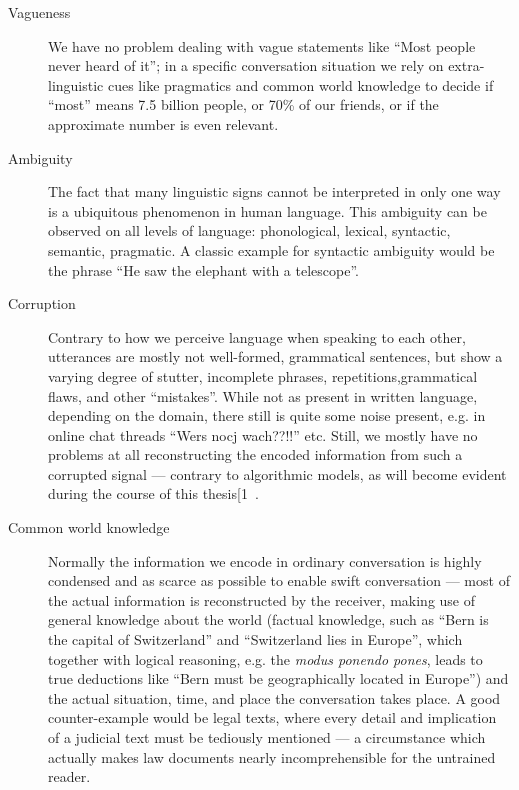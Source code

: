 \begin{description}
  \item[Vagueness] We have no problem dealing with vague statements like ``Most people never heard of it''; in a
    specific conversation situation we rely on extra-linguistic cues like pragmatics and common
    world knowledge to decide if ``most'' means 7.5 billion people, or 70\% of our friends, or if
    the approximate number is even relevant.
  \item[Ambiguity] The fact that many linguistic signs cannot be interpreted in only one way is a ubiquitous
    phenomenon in human language. This ambiguity can be observed on all levels of language: phonological, lexical, syntactic,
    semantic, pragmatic. A classic example for syntactic ambiguity would be the phrase ``He saw
    the elephant with a telescope''.
  \item[Corruption] Contrary to how we perceive language when speaking to each other, utterances are mostly
    not well-formed, grammatical sentences, but show a varying degree of stutter, incomplete
    phrases, repetitions,grammatical flaws, and other ``mistakes''. While not as present in
    written language, depending on the domain, there still is quite some noise present, e.g.
    in online chat threads ``Wers nocj wach??!!'' etc. Still, we mostly have no problems at
    all reconstructing the encoded information from such a corrupted signal --- contrary to
    algorithmic models, as will become evident during the course of this thesis[1~.
  \item[Common world knowledge] Normally the information we encode in ordinary conversation is highly condensed and as scarce
    as possible to enable swift conversation --- most of the actual information is reconstructed by the receiver, making use
    of general knowledge about the world (factual knowledge, such as ``Bern is the capital of
    Switzerland'' and ``Switzerland lies in Europe'', which together with logical reasoning, e.g.
    the \textit{modus ponendo pones}, leads to true deductions like ``Bern must be geographically
    located in Europe'') and the actual situation, time, and place the conversation takes place.
    A good counter-example would be legal texts, where every detail and implication of a judicial text
    must be tediously mentioned --- a circumstance which actually makes law documents nearly incomprehensible for the
    untrained reader.

\end{description}

